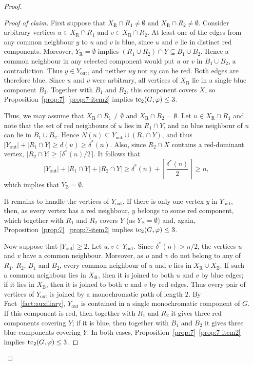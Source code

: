 \documentclass[12pt,reqno,a4paper]{amsart}
\newenvironment{claimproof}[1][Proof of claim]{\begin{proof}[#1]\renewcommand{\qedsymbol}{$\scriptstyle\square$}}{\end{proof}}
\def\tc{\mathop{\text{\rm tc}}\nolimits}
\newcommand{\out}{\mathrm{out}}
\newcommand{\R}{\mathrm{R}}
\newcommand{\B}{\mathrm{B}}
\begin{document}
\begin{proof}
\begin{claimproof}
First suppose that $X_{\R}\cap R_1\neq\emptyset$ and $X_{\R}\cap
R_2\neq\emptyset$. Consider arbitrary vertices $u\in X_{\R}\cap R_1$ and $v\in
X_{\R}\cap R_2$. At least one of the edges from any common neighbour $y$ to
$u$ and $v$ is blue, since $u$ and $v$ lie in distinct red components. Moreover,
$Y_{\R}=\emptyset$ implies $(R_1\cup R_2)\cap Y\subseteq B_1\cup B_2$. Hence a
common neighbour in any selected component would put $u$ or $v$ in
$B_1\cup B_2$, a contradiction. Thus $y\in Y_{\out}$, and neither $uy$ nor
$vy$ can be red. Both edges are therefore blue. Since $u$ and $v$ were
arbitrary, all vertices of $X_{\R}$ lie in a single blue component $B_3$.
Together with $B_1$ and $B_2$, this component covers $X$, so
Proposition~\ref{prop:7}~\ref{prop:7-item2} implies $\tc_2(G,\varphi)\le 3$.

Thus, we may assume that $X_{\R}\cap R_1\neq\emptyset$ and $X_{\R}\cap
R_2=\emptyset$. Let $u\in X_{\R}\cap R_1$ and note that the set of red
neighbours of $u$ lies in $R_1\cap Y$, and no blue neighbour of $u$ can lie in
$B_1\cup B_2$. Hence $N(u)\subseteq Y_{\out}\cup (R_1\cap Y)$, and thus
$|Y_{\out}|+|R_1\cap Y|\ge d(u)\ge \delta^*(n)$. Also, since $R_2\cap X$
contains a red-dominant vertex, $|R_2\cap Y|\ge \lceil\delta^*(n)/2\rceil$. It
follows that
\[
|Y_{\out}|+|R_1\cap Y|+|R_2\cap Y|
\ge \delta^*(n)+\left\lceil \frac{\delta^*(n)}{2}\right\rceil\ge n,
\]
which implies that $Y_{\B}=\emptyset$.

It remains to handle the vertices of $Y_{\out}$. If there is only one vertex $y$
in $Y_{\out}$, then, as every vertex has a red neighbour, $y$ belongs to some red
component, which together with $R_1$ and $R_2$ covers $Y$ (as
$Y_{\B}=\emptyset$) and, again, Proposition~\ref{prop:7}~\ref{prop:7-item2}
implies $\tc_2(G,\varphi)\le 3$.

Now suppose that $|Y_{\out}|\ge 2$. Let $u,v\in Y_{\out}$. Since
$\delta^*(n)>n/2$, the vertices $u$ and $v$ have a common neighbour. Moreover,
as $u$ and $v$ do not belong to any of $R_1$, $R_2$, $B_1$ and $B_2$, every
common neighbour of $u$ and $v$ lies in $X_{\R}\cup X_{\B}$. If such a common
neighbour lies in $X_{\R}$, then it is joined to both $u$ and $v$ by blue
edges; if it lies in $X_{\B}$, then it is joined to both $u$ and $v$ by red
edges. Thus every pair of vertices
of $Y_{\out}$ is joined by a monochromatic path of length $2$. By Fact~\ref{fact:auxiliary}, $Y_{\out}$ is contained in a single monochromatic component of $G$. If this
component is red, then together with $R_1$ and $R_2$ it gives three red
components covering $Y$; if it is blue, then together with $B_1$ and $B_2$ it
gives three blue components covering $Y$. In both cases,
Proposition~\ref{prop:7}~\ref{prop:7-item2} implies $\tc_2(G,\varphi)\le 3$.


\end{claimproof}
\end{proof}
\end{document}
